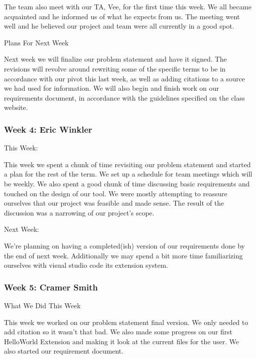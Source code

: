 The team also meet with our TA, Vee, for the first time this week. We all became acquainted and he informed us of what he expects from us. The meeting went well and he believed our project and team were all currently in a good spot.



Plans For Next Week

Next week we will finalize our problem statement and have it signed. The revisions will revolve around rewriting some of the specific terms to be in accordance with our pivot this last week, as well as adding citations to a source we had used for information. We will also begin and finish work on our requirements document, in accordance with the guidelines specified on the class website. \\ 

 \subsubsection{Week 4: Eric Winkler}

This Week:

This week we spent a chunk of time revisiting our problem statement and started a plan for the rest of the term. We set up a schedule for team meetings which will be weekly. We also spent a good chunk of time discussing basic requirements and touched on the design of our tool. We were mostly attempting to reassure ourselves that our project was feasible and made sense. The result of the discussion was a narrowing of our project's scope.



Next Week:

We're planning on having a completed(ish) version of our requirements done by the end of next week. Additionally we may spend a bit more time familiarizing ourselves with visual studio code its extension system. \\ 

 \subsubsection{Week 5: Cramer Smith}

What We Did This Week 



This week we worked on our problem statement final version. We only needed to add citation so it wasn't that bad. We also made some progress on our first HelloWorld Extension and making it look at the current files for the user. We also started our requirement document.



